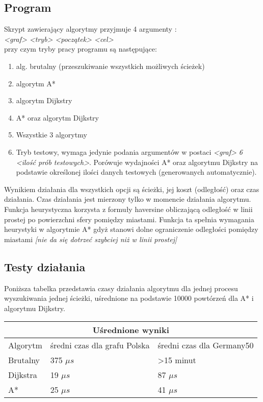 \documentclass[11pt]{article} %
\begin{document}
\subsection{Program}
Skrypt zawierający algorytmy przyjmuje 4 argumenty : \\ 
\textsl{<graf> <tryb> <początek> <cel>}\\
przy czym tryby pracy programu są następujące:
\begin{enumerate}
\item
alg. brutalny (przeszukiwanie wszystkich możliwych ścieżek)
\item
algorytm A* 
\item
algorytm Dijkstry
\item
A* oraz algorytm Dijkstry
\item
Wszystkie 3 algorytmy
\item
Tryb testowy, wymaga jedynie podania argumentów w postaci \textsl{<graf> 6 <ilość prób testowych>}. Porówuje wydajności A* oraz algorytmu Dijkstry na podstawie określonej ilości danych testowych (generowanych automatycznie).
\end{enumerate}
Wynikiem działania dla wszystkich opcji są ścieżki, jej koszt (odległość) oraz czas działania. Czas działania jest mierzony tylko w momencie działania algorytmu. Funkcja heurystyczna korzysta z formuły haversine obliczającą odległość w linii prostej po powierzchni sfery pomiędzy miastami. Funkcja ta spełnia wymagania heurystyki w algorytmie A* gdyż stanowi dolne ograniczenie odległości pomiędzy miastami \textsl{[nie da się dotrzeć szybciej niż w linii prostej]}
\subsection{Testy działania}
Poniższa tabelka przedstawia czasy działania algorytmu dla jednej procesu wyszukiwania jednej ścieżki, uśrednione na podstawie 10000 powtórzeń dla A* i algorytmu Dijkstry.
\begin{table}[h!]
\centering
\begin{tabular}{ ||p{3cm}||p{5cm}|p{5cm}||  }
\hline
\multicolumn{3}{|c|}{Uśrednione wyniki} \\
\hline
Algorytm & średni czas dla grafu Polska & średni czas dla Germany50 \\
\hline
Brutalny &375 $\mu s$ &>15 minut \\
Dijkstra &19 $\mu s$ &87 $\mu s$ \\
A* &25 $\mu s$ &41 $\mu s$ \\
\hline
\end{tabular}
\end{table}
\end{document}
